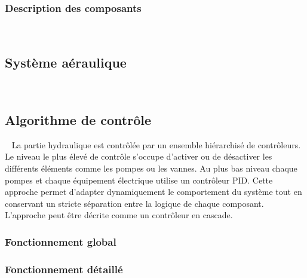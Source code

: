 \subsubsection{Description des composants} %
\label{ssub:description_des_composants}
~





\subsection{Système aéraulique} %
\label{sub:systeme_aeraulique}
~





\subsection{Algorithme de contrôle} %
\label{sub:algorithme_de_controle}
~
La partie hydraulique est contrôlée par un ensemble hiérarchisé de contrôleurs.
Le niveau le plus élevé de contrôle s’occupe d’activer ou de désactiver les différents
éléments comme les pompes ou les vannes. Au plus bas niveau chaque pompes et chaque
équipement électrique utilise un contrôleur PID. Cette approche permet d’adapter
dynamiquement le comportement du système tout en conservant un stricte séparation
entre la logique de chaque composant. L’approche peut être décrite comme un contrôleur
en cascade.


\subsubsection{Fonctionnement global} %
\label{ssub:fonctionnement_global}

\subsubsection{Fonctionnement détaillé} %
\label{ssub:fonctionnement_detaille}

